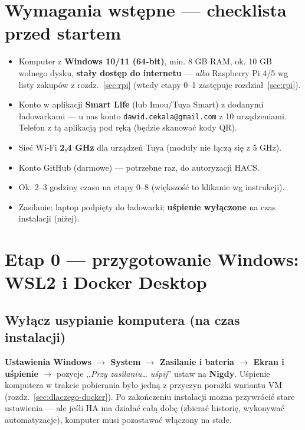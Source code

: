 \documentclass[11pt,a4paper]{article}
\begin{document}
\section{Wymagania wstępne --- checklista przed startem}

\begin{itemize}
\item Komputer z \textbf{Windows 10/11 (64-bit)}, min. 8 GB RAM, ok. 10 GB wolnego dysku, \textbf{stały dostęp do internetu} --- \emph{albo} Raspberry Pi 4/5 wg listy zakupów z rozdz.~\ref{sec:rpi} (wtedy etapy 0--1 zastępuje rozdział~\ref{sec:rpi}).
\item Konto w aplikacji \textbf{Smart Life} (lub Imou/Tuya Smart) z dodanymi ładowarkami --- u nas konto \texttt{dawid.cekala@gmail.com} z 10 urządzeniami. Telefon z tą aplikacją pod ręką (będzie skanować kody QR).
\item Sieć Wi-Fi \textbf{2,4 GHz} dla urządzeń Tuya (moduły nie łączą się z 5 GHz).
\item Konto GitHub (darmowe) --- potrzebne raz, do autoryzacji HACS.
\item Ok. 2--3 godziny czasu na etapy 0--8 (większość to klikanie wg instrukcji).
\item Zasilanie: laptop podpięty do ładowarki; \textbf{uśpienie wyłączone} na czas instalacji (niżej).
\end{itemize}

\section{Etap 0 --- przygotowanie Windows: WSL2 i Docker Desktop}
\label{sec:etap0}

\subsection{Wyłącz usypianie komputera (na czas instalacji)}

\textbf{Ustawienia Windows $\to$ System $\to$ Zasilanie i bateria $\to$ Ekran i uśpienie} $\to$ pozycje ,,\emph{Przy zasilaniu\ldots{} uśpij}'' ustaw na \textbf{Nigdy}. Uśpienie komputera w trakcie pobierania było jedną z przyczyn porażki wariantu VM (rozdz.~\ref{sec:dlaczego-docker}). Po zakończeniu instalacji można przywrócić stare ustawienia --- ale jeśli HA ma działać całą dobę (zbierać historię, wykonywać automatyzacje), komputer musi pozostawać włączony na stałe.
\end{document}
